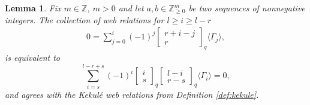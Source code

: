 \documentclass[12pt]{amsart}
\newtheorem{lemma}[theorem]{Lemma}
\theoremstyle{definition}
\theoremstyle{remark}
\numberwithin{equation}{section}
\numberwithin{figure}{section}
\newcommand{\Z}{\mathbb{Z}}
\begin{document}
\begin{lemma}\label{lem:true kekule}
Fix $m \in \Z$, $m > 0$ and let $a,b \in \Z_{\geq 0}^m$ be two sequences of nonnegative integers. The collection of web relations for $l \geq i \geq l - r$
\begin{align}\label{eq:true kekule}
    0 = \sum_{j=0}^{i}(-1)^j\begin{bmatrix}
    r+i-j\\
    r
  \end{bmatrix}_q\langle\Gamma_j\rangle,
\end{align}
is equivalent to
\[\sum_{i=s}^{l-r+s}(-1)^{i}\begin{bmatrix}
    i\\s
  \end{bmatrix}_q\begin{bmatrix}
    l-i\\r-s
  \end{bmatrix}_q\langle\Gamma_i\rangle=0,\]
  and agrees with the Kekulé web relations from Definition \ref{def:kekule}.
\end{lemma}
\end{document}
